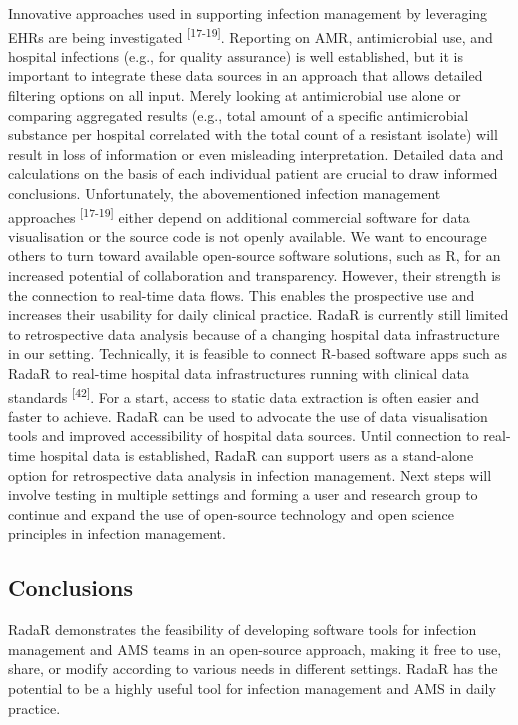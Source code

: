 \documentclass[
]{book}
\begin{document}
Innovative approaches used in supporting infection management by leveraging EHRs are being investigated \textsuperscript{{[}17-19{]}}. Reporting on AMR, antimicrobial use, and hospital infections (e.g., for quality assurance) is well established, but it is important to integrate these data sources in an approach that allows detailed filtering options on all input. Merely looking at antimicrobial use alone or comparing aggregated results (e.g., total amount of a specific antimicrobial substance per hospital correlated with the total count of a resistant isolate) will result in loss of information or even misleading interpretation. Detailed data and calculations on the basis of each individual patient are crucial to draw informed conclusions. Unfortunately, the abovementioned infection management approaches \textsuperscript{{[}17-19{]}} either depend on additional commercial software for data visualisation or the source code is not openly available. We want to encourage others to turn toward available open-source software solutions, such as R, for an increased potential of collaboration and transparency. However, their strength is the connection to real-time data flows. This enables the prospective use and increases their usability for daily clinical practice. RadaR is currently still limited to retrospective data analysis because of a changing hospital data infrastructure in our setting. Technically, it is feasible to connect R-based software apps such as RadaR to real-time hospital data infrastructures running with clinical data standards \textsuperscript{{[}42{]}}. For a start, access to static data extraction is often easier and faster to achieve. RadaR can be used to advocate the use of data visualisation tools and improved accessibility of hospital data sources. Until connection to real-time hospital data is established, RadaR can support users as a stand-alone option for retrospective data analysis in infection management. Next steps will involve testing in multiple settings and forming a user and research group to continue and expand the use of open-source technology and open science principles in infection management.

\hypertarget{conclusions}{%
\subsection{Conclusions}\label{conclusions}}

RadaR demonstrates the feasibility of developing software tools for infection management and AMS teams in an open-source approach, making it free to use, share, or modify according to various needs in different settings. RadaR has the potential to be a highly useful tool for infection management and AMS in daily practice.
\end{document}
